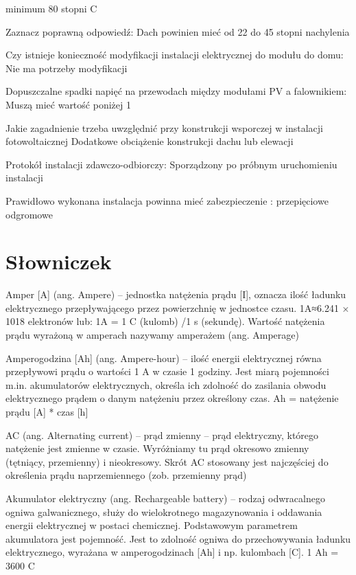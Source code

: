\documentclass[12pt,a4paper]{article}
\begin{document}
 minimum 80 stopni C

Zaznacz poprawną odpowiedź:
Dach powinien mieć od 22 do 45 stopni nachylenia

Czy istnieje konieczność modyfikacji instalacji elektrycznej do modułu do domu:
Nie ma potrzeby modyfikacji

Dopuszczalne spadki napięć na przewodach między modułami PV a falownikiem:
Muszą mieć wartość poniżej 1%

Jakie zagadnienie trzeba uwzględnić przy konstrukcji wsporczej w instalacji fotowoltaicznej 
Dodatkowe obciążenie konstrukcji dachu lub elewacji

Protokół instalacji zdawczo-odbiorczy:
Sporządzony po próbnym uruchomieniu instalacji 

Prawidłowo wykonana instalacja powinna mieć zabezpieczenie :
przepięciowe
odgromowe
\clearpage

\section{Słowniczek}
Amper [A] (ang. Ampere) – jednostka natężenia prądu [I], oznacza ilość ładunku elektrycznego przepływającego przez powierzchnię w jednostce czasu. 1A≈6.241 × 1018 elektronów lub: 1A = 1 C (kulomb) /1 s (sekundę). Wartość natężenia prądu wyrażoną w amperach nazywamy amperażem (ang. Amperage)

Amperogodzina [Ah] (ang. Ampere-hour) – ilość energii elektrycznej równa przepływowi prądu o wartości 1 A w czasie 1 godziny. Jest miarą pojemności m.in. akumulatorów elektrycznych, określa ich zdolność do zasilania obwodu elektrycznego prądem o danym natężeniu przez określony czas.
Ah = natężenie prądu  [A] * czas [h]

AC (ang. Alternating current) – prąd zmienny – prąd elektryczny, którego natężenie jest zmienne w czasie. Wyróżniamy tu prąd okresowo zmienny (tętniący, przemienny) i nieokresowy. Skrót AC stosowany jest najczęściej do określenia prądu naprzemiennego (zob. przemienny prąd)

Akumulator elektryczny (ang. Rechargeable battery) – rodzaj odwracalnego ogniwa galwanicznego, służy do wielokrotnego magazynowania i oddawania energii elektrycznej w postaci chemicznej. Podstawowym parametrem akumulatora jest pojemność. Jest to zdolność ogniwa do przechowywania ładunku elektrycznego, wyrażana w amperogodzinach [Ah] i np. kulombach [C]. 1 Ah = 3600 C
\end{document}
